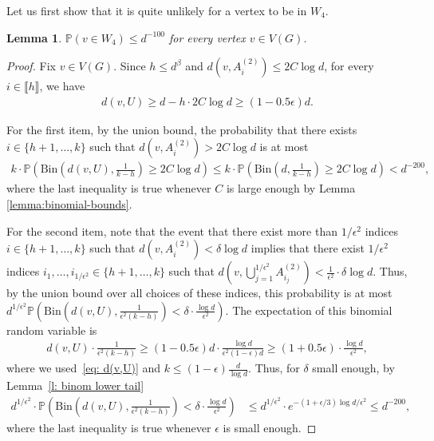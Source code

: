 \documentclass[notitlepage]{scrartcl}
\newcommand{\br}[1]{\llbracket{#1}\rrbracket}
\newtheorem{lemma}[thm]{Lemma}
\renewcommand{\Pr}{\mathbb{P}}
\begin{document}
Let us first show that it is quite unlikely for a vertex to be in $W_4$.
\begin{lemma}\label{l: prob w0}
    $\Pr(v \in W_4) \le d^{-100}$ for every vertex $v \in V(G)$.
\end{lemma}
\begin{proof}
    Fix $v \in V(G)$. Since $h \le d^{\beta}$ and $d(v, A_i^{(2)}) \le 2C \log d$, for every $i \in \br{h}$, we have 
    \begin{align}
           d(v, U) \ge d - h \cdot 2C \log d \ge (1 - 0.5\epsilon)d. \label{eq: d(v,U)}
    \end{align}

    For the first item, by the union bound, the probability that there exists $i \in \{h+1,\ldots,k\}$ such that $d(v, A_i^{(2)}) > 2C \log d$ is at most 
    \begin{align*}
        k \cdot \Pr\left(\text{Bin}\left(d(v, U), \frac{1}{k - h}\right) \ge 2C \log d\right)  \le k\cdot \Pr\left(\text{Bin}\left(d,\frac{1}{k-h}\right)\ge 2C\log d\right)< d^{-200},
    \end{align*}
    where the last inequality is true whenever $C$ is large enough by Lemma \ref{lemma:binomial-bounds}.

    For the second item, note that the event that there exist more than $1 / \epsilon^2$ indices $i \in \{h+1,\ldots,k\}$ such that $d(v, A_i^{(2)}) < \delta \log d$ implies that there exist $1 / \epsilon^2$ indices $i_1, \dots, i_{1/\epsilon^2} \in \{h+1,\ldots,k\}$ such that $d\left(v, \bigcup_{j=1}^{1/\epsilon^2} A_{i_j}^{(2)}\right) < \frac{1}{\epsilon^2} \cdot \delta \log d$. Thus, by the union bound over all choices of these indices, this probability is at most $d^{1/\epsilon^2} \Pr\left(\text{Bin}\left(d(v, U), \frac{1}{\epsilon^2(k-h)}\right) < \delta \cdot \frac{\log d}{\epsilon^2}\right).$
    The expectation of this binomial random variable is 
    \begin{align*}
        d(v, U) \cdot \frac{1}{\epsilon^2(k-h)} \ge (1 - 0.5\epsilon)d \cdot \frac{\log d}{\epsilon^2 (1-\epsilon) d} \ge (1+0.5\epsilon) \cdot \frac{\log d}{\epsilon^2}, 
    \end{align*}
    where we used~\eqref{eq: d(v,U)} and $k \le (1-\epsilon)\frac{d}{\log d}$. Thus, for $\delta$ small enough, by Lemma~\ref{l: binom lower tail}
    \begin{align*}
        d^{1/\epsilon^2} \cdot \Pr\left(\text{Bin}\left(d(v, U), \frac{1}{\epsilon^2(k-h)}\right) < \delta \cdot \frac{\log d}{\epsilon^2}\right)
        &\le d^{1/\epsilon^2}\cdot e^{-(1+\epsilon/3)\log d/\epsilon^2} \le d^{-200},
    \end{align*}
    where the last inequality is true whenever $\epsilon$ is small enough.


\end{proof}
\end{document}
